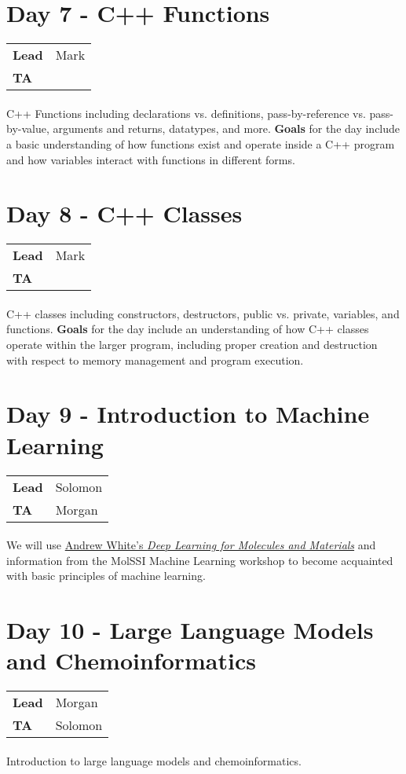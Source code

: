 \documentclass[letterpaper,10pt,oneside]{article}
\begin{document}
\section*{Day 7 - C++ Functions}
\begin{tabular}{p{1.5cm}l}
    \textbf{Lead} & Mark \\
    \textbf{TA} & \\
\end{tabular}
\paragraph{} C++ Functions including declarations vs. definitions, pass-by-reference vs. pass-by-value, arguments and returns, datatypes, and more.
\textbf{Goals} for the day include a basic understanding of how functions exist and operate inside a C++ program and how variables interact with functions in different forms.

\section*{Day 8 - C++ Classes}
\begin{tabular}{p{1.5cm}l}
    \textbf{Lead} & Mark \\
    \textbf{TA} & \\
\end{tabular}
\paragraph{} C++ classes including constructors, destructors, public vs. private, variables, and functions.
\textbf{Goals} for the day include an understanding of how C++ classes operate within the larger program, including proper creation and destruction with respect to memory management and program execution.

\section*{Day 9 - Introduction to Machine Learning}
\begin{tabular}{p{1.5cm}l}
    \textbf{Lead} & Solomon \\
    \textbf{TA} & Morgan \\
\end{tabular}
\paragraph{} We will use \href{https://dmol.pub/}{Andrew White's \textit{Deep Learning for Molecules and Materials}} and information from the MolSSI Machine Learning workshop to become acquainted with basic principles of machine learning.

\section*{Day 10 - Large Language Models and Chemoinformatics}
\begin{tabular}{p{1.5cm}l}
    \textbf{Lead} & Morgan \\
    \textbf{TA} & Solomon \\
\end{tabular}
\paragraph{} Introduction to large language models and chemoinformatics.
\end{document}
